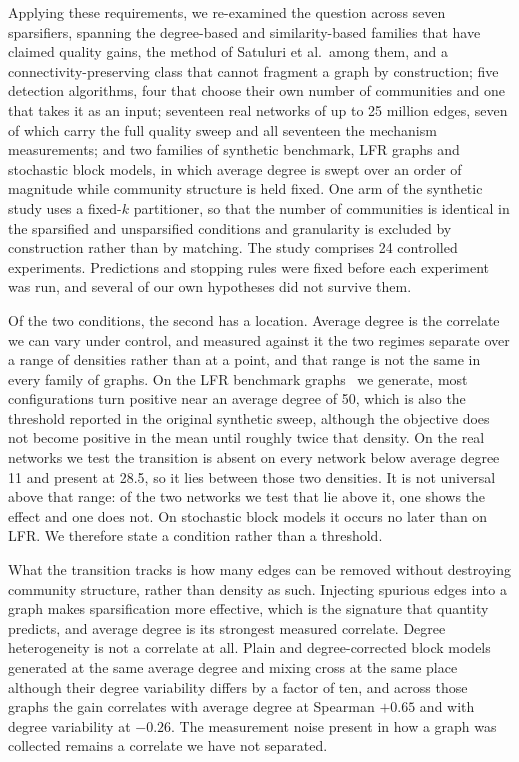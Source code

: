 Applying these requirements, we re-examined the question across seven
sparsifiers, spanning the degree-based and similarity-based families that have
claimed quality gains, the method of Satuluri et al.\ among them, and a
connectivity-preserving class that cannot fragment a graph by construction; five
detection algorithms, four that choose their own number of communities and one
that takes it as an input; seventeen real
networks of up to 25 million edges, seven of which carry the full quality sweep
and all seventeen the mechanism measurements; and two families of synthetic
benchmark, LFR
graphs and stochastic block models, in which average degree is swept over an
order of magnitude while community structure is held fixed. One arm of the
synthetic study uses a fixed-$k$ partitioner, so that the number of communities is
identical in the sparsified and unsparsified conditions and granularity is
excluded by construction rather than by matching. The study comprises 24
controlled experiments. Predictions and stopping rules were fixed before each
experiment was run, and several of our own hypotheses did not survive them.

Of the two conditions, the second has a location. Average degree is the correlate
we can vary under control, and measured against it the two regimes separate over
a range of densities rather than at a point, and that range is not the same in
every family of graphs. On the LFR benchmark graphs~\cite{lancichinetti2008benchmark} we
generate, most configurations turn positive near an average degree of 50, which
is also the threshold reported in the original synthetic sweep, although the
objective does not become positive in the mean until roughly twice that density.
On the real networks we test the transition is absent on every network below
average degree 11 and present at 28.5, so it lies between those two densities.
It is not universal above that range: of the two networks we test that lie above
it, one shows the effect and one does not. On stochastic block models it occurs
no later than on LFR. We therefore state a condition rather than a threshold.

What the transition tracks is how many edges can be removed without destroying
community structure, rather than density as such. Injecting spurious edges into a
graph makes sparsification more effective, which is the signature that quantity
predicts, and average degree is its strongest measured correlate. Degree
heterogeneity is not a correlate at all. Plain and degree-corrected block models
generated at the same average degree and mixing cross at the same place although
their degree variability differs by a factor of ten, and across those graphs the
gain correlates with average degree at Spearman $+0.65$ and with degree
variability at $-0.26$. The measurement noise present in how a graph was
collected remains a correlate we have not separated.

